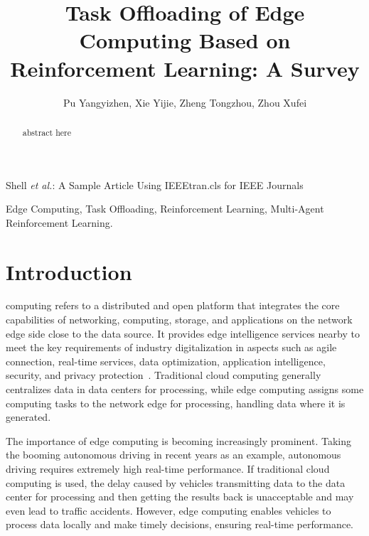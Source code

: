 \documentclass[journal]{IEEEtran}
\begin{document}
\title{Task Offloading of Edge Computing Based on Reinforcement Learning: A Survey}

\author{Pu Yangyizhen, Xie Yijie, Zheng Tongzhou, Zhou Xufei}

%
{Shell \MakeLowercase{\textit{et al.}}: A Sample Article Using IEEEtran.cls for IEEE Journals}


\maketitle

\begin{abstract}
abstract here
\end{abstract}

\begin{IEEEkeywords}
Edge Computing, Task Offloading, Reinforcement Learning, Multi-Agent Reinforcement Learning.
\end{IEEEkeywords}

\section{Introduction}
 computing refers to a distributed and open platform that integrates the core capabilities of networking, 
computing, storage, and applications on the network edge side close to the data source. 
It provides edge intelligence services nearby to meet the key requirements of industry digitalization in aspects such as agile connection, 
real-time services, data optimization, application intelligence, security, and privacy protection~\cite{zheng01}. 
Traditional cloud computing generally centralizes data in data centers for processing, 
while edge computing assigns some computing tasks to the network edge for processing, handling data where it is generated.

The importance of edge computing is becoming increasingly prominent. 
Taking the booming autonomous driving in recent years as an example, autonomous driving requires extremely high real-time performance. 
If traditional cloud computing is used, the delay caused by vehicles transmitting data to the data center for processing and then 
getting the results back is unacceptable and may even lead to traffic accidents. 
However, edge computing enables vehicles to process data locally and make timely decisions, ensuring real-time performance.
\end{document}

